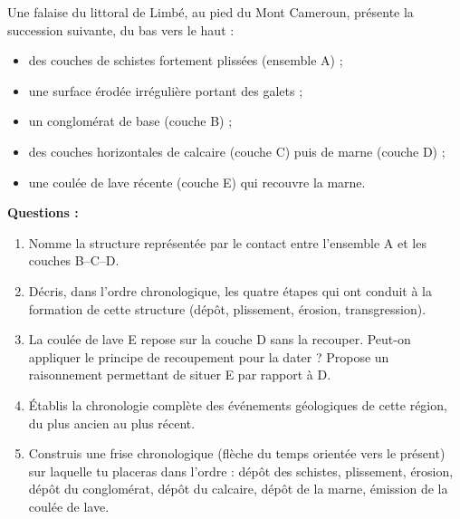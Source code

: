 \documentclass[11pt]{article}
\begin{document}
\begin{exercice}
Une falaise du littoral de Limbé, au pied du Mont Cameroun, présente la succession suivante, du bas vers le haut :
\begin{itemize}
\item des couches de schistes fortement plissées (ensemble A) ;
\item une surface érodée irrégulière portant des galets ;
\item un conglomérat de base (couche B) ;
\item des couches horizontales de calcaire (couche C) puis de marne (couche D) ;
\item une coulée de lave récente (couche E) qui recouvre la marne.
\end{itemize}

\textbf{Questions :}
\begin{enumerate}
\item Nomme la structure représentée par le contact entre l'ensemble A et les couches B--C--D.
\item Décris, dans l'ordre chronologique, les quatre étapes qui ont conduit à la formation de cette structure (dépôt, plissement, érosion, transgression).
\item La coulée de lave E repose sur la couche D sans la recouper. Peut-on appliquer le principe de recoupement pour la dater ? Propose un raisonnement permettant de situer E par rapport à D.
\item Établis la chronologie complète des événements géologiques de cette région, du plus ancien au plus récent.
\item Construis une frise chronologique (flèche du temps orientée vers le présent) sur laquelle tu placeras dans l'ordre : dépôt des schistes, plissement, érosion, dépôt du conglomérat, dépôt du calcaire, dépôt de la marne, émission de la coulée de lave.
\end{enumerate}
\end{exercice}
\end{document}
